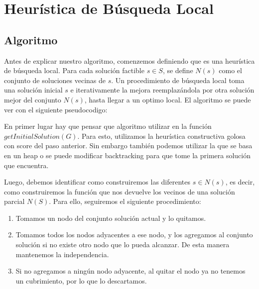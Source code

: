 \section{Heurística de Búsqueda Local}

\subsection{Algoritmo}

Antes de explicar nuestro algoritmo, comenzemos definiendo que es una heurística de búsqueda local. Para cada solución factible $s \in S$, se define $N(s)$ como el conjunto de soluciones vecinas de $s$. Un procedimiento de búsqueda local toma una solución inicial $s$ e iterativamente la mejora reemplazándola por otra solución mejor del conjunto $N(s)$, hasta llegar a un optimo local. El algoritmo se puede ver con el siguiente pseudocodigo:

\begin{algorithmic}
		\EndIf
	\EndFor
\EndWhile
\EndProcedure
\end{algorithmic}

\hspace{1px}

En primer lugar hay que pensar que algoritmo utilizar en la función $getInitialSolution(G)$. Para esto, utilizamos la heurística constructiva golosa con score del paso anterior. Sin embargo también podemos utilizar la que se basa en un heap o se puede modificar backtracking para que tome la primera solución que encuentra.

Luego, debemos identificar como construiremos las diferentes $s \in N(s)$, es decir, como construiremos la función que nos devuelve los vecinos de una solución parcial $N(S)$. Para ello, seguiremos el siguiente procedimiento:

\begin{enumerate}
\item Tomamos un nodo del conjunto solución actual y lo quitamos.
\item Tomamos todos los nodos adyacentes a ese nodo, y los agregamos al conjunto solución si no existe otro nodo que lo pueda alcanzar. De esta manera mantenemos la independencia.
\item Si no agregamos a ningún nodo adyacente, al quitar el nodo ya no tenemos un cubrimiento, por lo que lo descartamos.
\end{enumerate}

